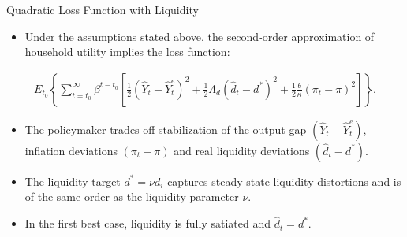 \documentclass[11pt,aspectratio=169]{beamer}
\begin{document}
\begin{frame}[label=Loss Function]{Quadratic Loss Function with Liquidity}

\begin{itemize}
  \item Under the assumptions stated above, the second-order approximation of household utility implies the loss function:
\end{itemize}

\begin{align}
  E_{t_0}\!\left\{
  \sum_{t=t_0}^{\infty} \beta^{t-t_0}
  \left[
    \frac{1}{2}(\hat Y_t - \hat Y_t^e)^2
    + \frac{1}{2}\Lambda_d(\hat d_t - d^*)^2
    + \frac{1}{2}\frac{\theta}{\kappa}(\pi_t - \pi)^2
  \right]
  \right\}. \label{8.27}
\end{align}

\begin{itemize}
  \item The policymaker trades off stabilization of the output gap $(\hat Y_t - \hat Y_t^e)$, inflation deviations $(\pi_t - \pi)$ and real liquidity deviations $(\hat d_t - d^*)$.

  \item The liquidity target $d^* = \nu d_i$ captures steady-state liquidity distortions and is of the same order as the liquidity parameter $\nu$.
 \item In the first best case, liquidity is fully satiated and $\hat d_t = d^*$.
 \vspace{0.1cm}
\begin{center}
\hyperlink{Appendix H.1}{}
\end{center}
\end{itemize}

\end{frame}
\end{document}
